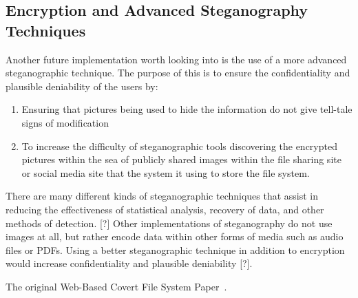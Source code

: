 \documentclass[12pt,journal,compsoc]{IEEEtran}
\begin{document}
\subsection{Encryption and Advanced Steganography Techniques}

Another future implementation worth looking into is the use of a more advanced steganographic technique. The purpose of this is to ensure the confidentiality and plausible deniability of the users by:
\begin{enumerate}
\item Ensuring that pictures being used to hide the information do not give tell-tale signs of modification
\item To increase the difficulty of steganographic tools discovering the encrypted pictures within the sea of publicly shared images within the file sharing site or social media site that the system it using to store the file system.
\end{enumerate}
There are many different kinds of steganographic techniques that assist in reducing the effectiveness of statistical analysis, recovery of data, and other methods of detection. [?] Other implementations of steganography do not use images at all, but rather encode data within other forms of media such as audio files or PDFs. Using a better steganographic technique in addition to encryption would increase confidentiality and plausible deniability [?]. %



The original Web-Based Covert File System Paper~\cite{Baliga2007}.


\end{document}
